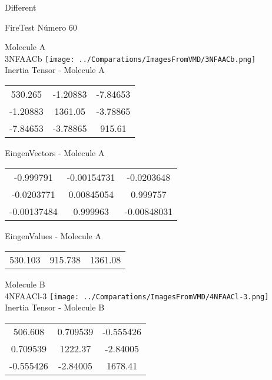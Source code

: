 \begin{center}
\vtab
\vtab
\textcolor{NavyBlue}{\Large Different}
\end{center}

 \newpage

\vtab[-2cm]
\begin{center}
{\large FireTest \tab Número 60}
\end{center}
\begin{multicols}{2}
\begin{center}

Molecule A \\ 
3NFAACb
\texttt{[image: ../Comparations/ImagesFromVMD/3NFAACb.png]}
\\
Inertia Tensor - Molecule A \\
\vtab

\begin{tabular}{|c c c|}
530.265	 & 	-1.20883	 & 	-7.84653	 \\
-1.20883	 & 	1361.05	 & 	-3.78865	 \\
-7.84653	 & 	-3.78865	 & 	915.61
\end{tabular}

\vtab
 EingenVectors - Molecule A     \\
\vtab
\begin{tabular}{|c c c|}
-0.999791	 & 	-0.00154731	 & 	-0.0203648	 \\
-0.0203771	 & 	0.00845054	 & 	0.999757	 \\
-0.00137484	 & 	0.999963	 & 	-0.00848031
\end{tabular}

\vtab
 EingenValues - Molecule A     \\
\vtab
\begin{tabular}{|c c c|}
530.103	 & 	915.738	 & 	1361.08	 \\
\end{tabular}
\columnbreak

Molecule B \\ 
4NFAACl-3
\texttt{[image: ../Comparations/ImagesFromVMD/4NFAACl-3.png]}
\\
Inertia Tensor - Molecule B \\
\vtab

\begin{tabular}{|c c c|}
506.608	 & 	0.709539	 & 	-0.555426	 \\
0.709539	 & 	1222.37	 & 	-2.84005	 \\
-0.555426	 & 	-2.84005	 & 	1678.41
\end{tabular}


\end{center}
\end{multicols}
